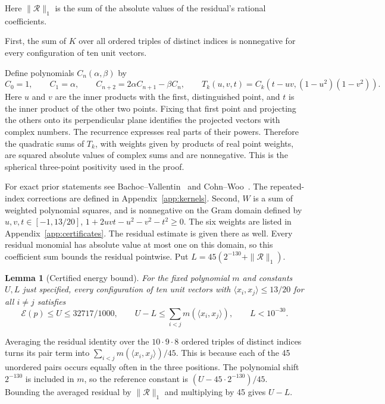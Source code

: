 \documentclass[11pt]{article}
\newtheorem{lemma}{Lemma}
\newcommand{\E}{\mathcal{E}}
\begin{document}
Here $\|\mathcal R\|_1$ is the sum of the absolute values of the residual's
rational coefficients.

First, the sum of $K$ over
all ordered triples of distinct indices is nonnegative for every
configuration of ten unit vectors.

Define polynomials $C_n(\alpha,\beta)$ by
\[
 C_0=1,\qquad C_1=\alpha,\qquad
 C_{n+2}=2\alpha C_{n+1}-\beta C_n,
 \qquad T_k(u,v,t)=C_k(t-uv,(1-u^2)(1-v^2)).
\]
Here $u$ and $v$ are the inner products with the first, distinguished
point, and $t$ is the inner product of the other two points.
Fixing that
first point and projecting the others onto its perpendicular plane
identifies the projected vectors with complex numbers. The
recurrence expresses real parts of their powers. Therefore the quadratic sums of $T_k$, with weights given by products
of real point weights, are squared absolute values of complex sums and
are nonnegative.
This is the spherical three-point positivity used in the proof.

For exact prior statements see Bachoc--Vallentin~\cite[Corollary~3.5]{bachoc}
and Cohn--Woo~\cite[Theorem~5]{cohnwoo}. The
repeated-index corrections are defined in Appendix~\ref{app:kernels}.
Second, $W$ is a sum of weighted polynomial squares, and is nonnegative
on the Gram domain defined by
$u,v,t\in[-1,13/20]$, $1+2uvt-u^2-v^2-t^2\geq0$.
The six weights are listed in Appendix~\ref{app:certificates}.
The residual estimate is given there as well.
Every residual monomial has absolute value at most one on this domain,
so this coefficient sum bounds the residual pointwise.
Put $L=45(2^{-130}+\|\mathcal R\|_1)$.

\begin{lemma}[Certified energy bound]\label{lem:threepoint}
For the fixed polynomial $m$ and constants $U,L$ just specified, every
configuration of ten unit vectors with
$\langle x_i,x_j\rangle\leq13/20$ for all $i\ne j$ satisfies
\[
 \E(p)\leq U\leq32717/1000,\qquad
 U-L\leq\sum_{i<j}m(\langle x_i,x_j\rangle),\qquad L<10^{-30}.
\]
\end{lemma}

Averaging the residual identity over the $10\cdot9\cdot8$ ordered
triples of distinct indices turns its pair term into
$\sum_{i<j}m(\langle x_i,x_j\rangle)/45$. This is because each of
the 45 unordered pairs occurs equally often in the three positions.
The polynomial shift $2^{-130}$ is included in $m$, so the reference
constant is $(U-45\cdot2^{-130})/45$. Bounding the averaged residual
by $\|\mathcal R\|_1$ and multiplying by 45 gives $U-L$.
\end{document}
